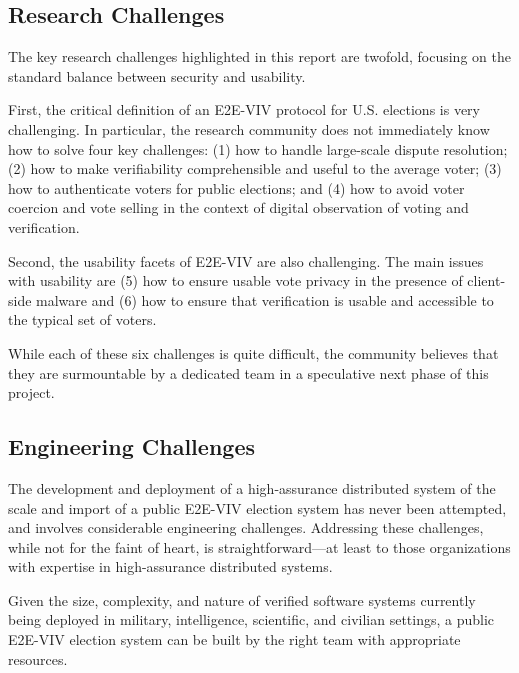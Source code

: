 \subsection{Research Challenges}

The key research challenges highlighted in this report are twofold,
focusing on the standard balance between security and usability.

First, the critical definition of an E2E-VIV protocol for
U.S. elections is very challenging. In particular, the research
community does not immediately know how to solve four key challenges:
(1) how to handle large-scale dispute resolution; (2) how to make
verifiability comprehensible and useful to the average voter; (3) how
to authenticate voters for public elections; and (4) how to avoid
voter coercion and vote selling in the context of digital observation
of voting and verification.

Second, the usability facets of E2E-VIV are also challenging. The main
issues with usability are (5) how to ensure usable vote privacy in the
presence of client-side malware and (6) how to ensure that
verification is usable and accessible to the typical set of voters.

While each of these six challenges is quite difficult, the community
believes that they are surmountable by a dedicated team in a
speculative next phase of this project.

\subsection{Engineering Challenges}

The development and deployment of a high-assurance distributed system
of the scale and import of a public E2E-VIV election system has never
been attempted, and involves considerable engineering
challenges. Addressing these challenges, while not for the faint of
heart, is straightforward---at least to those organizations with
expertise in high-assurance distributed systems.

Given the size, complexity, and nature of verified software systems
currently being deployed in military, intelligence, scientific, and
civilian settings, a public E2E-VIV election system can be built by
the right team with appropriate resources.

